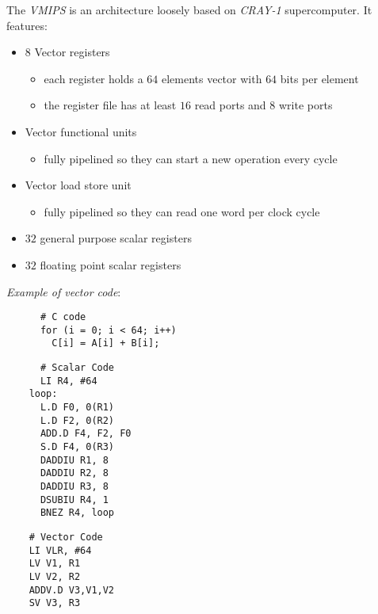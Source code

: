 \documentclass[english]{article}
\begin{document}
The \textit{VMIPS} is an architecture loosely based on \textit{CRAY-1} supercomputer.
It features:

\begin{itemize}
  \item \(8\) Vector registers
        \begin{itemize}
          \item each register holds a \(64\) elements vector with \(64\) bits per element
          \item the register file has at least \(16\) read ports and \(8\) write ports
        \end{itemize}
  \item Vector functional units
        \begin{itemize}
          \item fully pipelined so they can start a new operation every cycle
        \end{itemize}
  \item Vector load store unit
        \begin{itemize}
          \item fully pipelined so they can read one word per clock cycle
        \end{itemize}
  \item \(32\) general purpose scalar registers
  \item \(32\) floating point scalar registers
\end{itemize}

\bigskip
\textit{Example of vector code}:

\begin{minipage}{\textwidth}
  \bigskip
  \begin{minipage}[t]{0.4\textwidth}
    \begin{verbatim}
      # C code
      for (i = 0; i < 64; i++)
        C[i] = A[i] + B[i];
    \end{verbatim}
  \end{minipage}
  \begin{minipage}[t]{0.29\textwidth}
    \begin{verbatim}
      # Scalar Code
      LI R4, #64
    loop:
      L.D F0, 0(R1)
      L.D F2, 0(R2)
      ADD.D F4, F2, F0
      S.D F4, 0(R3)
      DADDIU R1, 8
      DADDIU R2, 8
      DADDIU R3, 8
      DSUBIU R4, 1
      BNEZ R4, loop
\end{verbatim}
  \end{minipage}
  \begin{minipage}[t]{0.29\textwidth}
    \begin{verbatim}
    # Vector Code
    LI VLR, #64
    LV V1, R1
    LV V2, R2
    ADDV.D V3,V1,V2
    SV V3, R3
  \end{verbatim}
  \end{minipage}
  \bigskip
\end{minipage}
\end{document}
